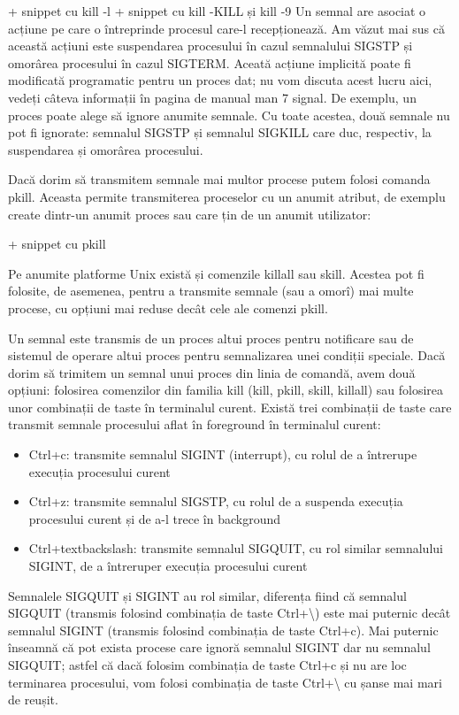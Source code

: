 +  snippet cu kill -l
+  snippet cu kill -KILL și kill -9
%
Un semnal are asociat o acțiune pe care o întreprinde procesul care-l
recepționează. Am văzut mai sus că această acțiuni este suspendarea procesului
în cazul semnalului SIGSTP și omorârea procesului în cazul SIGTERM. Aceată
acțiune implicită poate fi modificată programatic pentru un proces dat; nu vom
discuta acest lucru aici, vedeți câteva informații în pagina de manual man 7
signal. De exemplu, un proces poate alege să ignore anumite semnale. Cu toate
acestea, două semnale nu pot fi ignorate: semnalul SIGSTP și semnalul SIGKILL
care duc, respectiv, la suspendarea și omorârea procesului.

Dacă dorim să transmitem semnale mai multor procese putem folosi comanda pkill.
Aceasta permite transmiterea proceselor cu un anumit atribut, de exemplu create
dintr-un anumit proces sau care țin de un anumit utilizator:

+     snippet cu pkill

Pe anumite platforme Unix există și comenzile killall sau skill. Acestea pot fi
folosite, de asemenea, pentru a transmite semnale (sau a omorî) mai multe
procese, cu opțiuni mai reduse decât cele ale comenzi pkill.

Un semnal este transmis de un proces altui proces pentru notificare sau de
sistemul de operare altui proces pentru semnalizarea unei condiții speciale.
Dacă dorim să trimitem un semnal unui proces din linia de comandă, avem două
opțiuni: folosirea comenzilor din familia kill (kill, pkill, skill, killall) sau
folosirea unor combinații de taste în terminalul curent. Există trei combinații
de taste care transmit semnale procesului aflat în foreground în terminalul
curent:

\begin{itemize}
	\item Ctrl+c: transmite semnalul SIGINT (interrupt), cu rolul de a
		întrerupe execuția procesului curent
	\item Ctrl+z: transmite semnalul SIGSTP, cu rolul de a suspenda execuția
		procesului curent și de a-l trece în background
	\item Ctrl+textbackslash{}: transmite semnalul SIGQUIT, cu rol similar semnalului
		SIGINT, de a întreruper execuția procesului curent
\end{itemize}

Semnalele SIGQUIT și SIGINT au rol similar, diferența fiind că semnalul SIGQUIT
(transmis folosind combinația de taste Ctrl+\textbackslash{}) este mai puternic
decât semnalul SIGINT (transmis folosind combinația de taste Ctrl+c). Mai
puternic înseamnă că pot exista procese care ignoră semnalul SIGINT dar nu
semnalul SIGQUIT; astfel că dacă folosim combinația de taste Ctrl+c și nu are
loc terminarea procesului, vom folosi combinația de taste Ctrl+\textbackslash{} cu șanse mai
mari de reușit.

